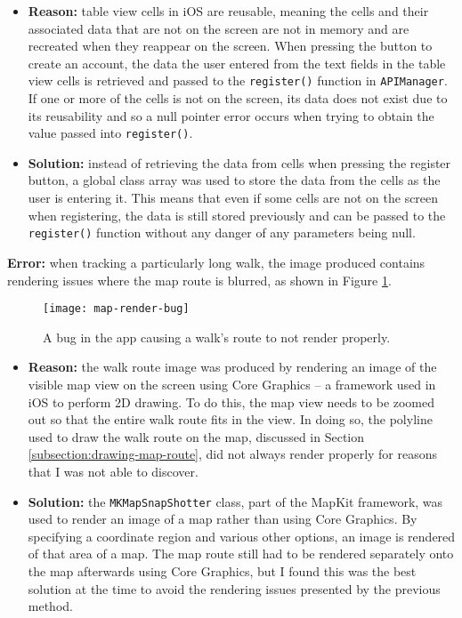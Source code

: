 \begin{itemize}
  \item \textbf{Reason:} table view cells in iOS are reusable, meaning the cells and their associated data that are not on the screen are not in memory and are recreated when they reappear on the screen. When pressing the button to create an account, the data the user entered from the text fields in the table view cells is retrieved and passed to the \verb|register()| function in \verb|APIManager|. If one or more of the cells is not on the screen, its data does not exist due to its reusability and so a null pointer error occurs when trying to obtain the value passed into \verb|register()|.
  
  \item \textbf{Solution:} instead of retrieving the data from cells when pressing the register button, a global class array was used to store the data from the cells as the user is entering it. This means that even if some cells are not on the screen when registering, the data is still stored previously and can be passed to the \verb|register()| function without any danger of any parameters being null.
\end{itemize}
  
\noindent \textbf{Error:} when tracking a particularly long walk, the image produced contains rendering issues where the map route is blurred, as shown in Figure \ref{fig:map-render-bug}.

\begin{figure}[hbt]
  \centering
  \texttt{[image: map-render-bug]}
  \caption{A bug in the app causing a walk's route to not render properly.}
  \label{fig:map-render-bug}
\end{figure}


\begin{itemize}
  \item \textbf{Reason:} the walk route image was produced by rendering an image of the visible map view on the screen using Core Graphics -- a framework used in iOS to perform 2D drawing. To do this, the map view needs to be zoomed out so that the entire walk route fits in the view. In doing so, the polyline used to draw the walk route on the map, discussed in Section \ref{subsection:drawing-map-route}, did not always render properly for reasons that I was not able to discover.
  
  \item \textbf{Solution:} the \verb|MKMapSnapShotter| class, part of the MapKit framework, was used to render an image of a map rather than using Core Graphics. By specifying a coordinate region and various other options, an image is rendered of that area of a map. The map route still had to be rendered separately onto the map afterwards using Core Graphics, but I found this was the best solution at the time to avoid the rendering issues presented by the previous method.
\end{itemize}

